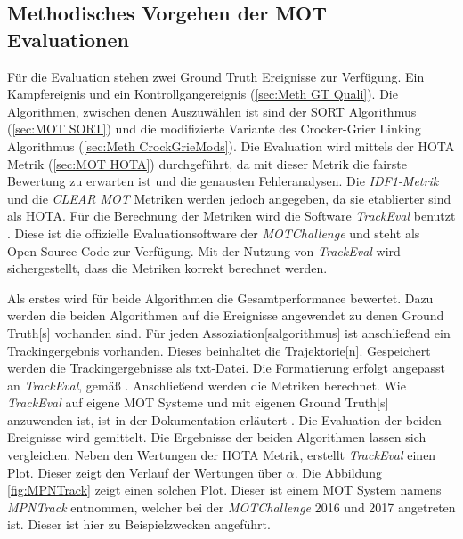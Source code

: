 \subsection{Methodisches Vorgehen der MOT Evaluationen}
Für die Evaluation stehen zwei \gls{Ground Truth} Ereignisse zur Verfügung. Ein Kampfereignis und ein Kontrollgangereignis (\autoref{sec:Meth GT Quali}). Die Algorithmen, zwischen denen Auszuwählen ist sind der \acrshort{SORT} Algorithmus (\autoref{sec:MOT SORT}) und die modifizierte Variante des Crocker-Grier Linking Algorithmus (\autoref{sec:Meth CrockGrieMods}). Die Evaluation wird mittels der \gls{HOTA} Metrik (\autoref{sec:MOT HOTA}) durchgeführt, da mit dieser Metrik die fairste Bewertung zu erwarten ist und die genausten Fehleranalysen. Die \textit{\gls{IDF1}-Metrik} und die \textit{\acrshort{CLEAR} \gls{MOT}} Metriken werden jedoch angegeben, da sie etablierter sind als \gls{HOTA}. Für die Berechnung der Metriken wird die Software \textit{TrackEval} benutzt \cite{TrackEval.2020}. Diese ist die offizielle Evaluationsoftware der \textit{MOTChallenge} und steht als Open-Source Code zur Verfügung. Mit der Nutzung von \textit{TrackEval} wird sichergestellt, dass die Metriken korrekt berechnet werden. \par

Als erstes wird für beide Algorithmen die Gesamtperformance bewertet. Dazu werden die beiden Algorithmen auf die Ereignisse angewendet zu denen \gls{Ground Truth}[s] vorhanden sind. Für jeden \gls{Assoziation}[salgorithmus] ist anschließend ein Trackingergebnis vorhanden. Dieses beinhaltet die \gls{Trajektorie}[n]. Gespeichert werden die Trackingergebnisse als txt-Datei. Die Formatierung erfolgt angepasst an \textit{TrackEval}, gemäß \cite{MOT15}. Anschließend werden die Metriken berechnet. Wie \textit{TrackEval} auf eigene \gls{MOT} Systeme und mit eigenen \gls{Ground Truth}[s] anzuwenden ist, ist in der Dokumentation erläutert \cite{TrackEval.2020}. Die Evaluation der beiden Ereignisse wird gemittelt. Die Ergebnisse der beiden Algorithmen lassen sich vergleichen. Neben den Wertungen der \gls{HOTA} Metrik, erstellt \textit{TrackEval} einen Plot. Dieser zeigt den Verlauf der Wertungen über \(\alpha\). Die Abbildung \ref{fig:MPNTrack} zeigt einen solchen Plot. Dieser ist einem \gls{MOT} System namens \textit{MPNTrack} entnommen, welcher bei der \textit{MOTChallenge} 2016 und 2017 angetreten ist. Dieser ist hier zu Beispielzwecken angeführt. 

